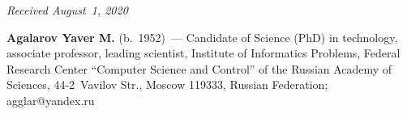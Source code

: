 \vspace*{-3pt}

  \hfill{\small\textit{Received August~1, 2020}}



\vspace*{-8pt}



\Contrl

\noindent
  \textbf{Agalarov Yaver M.} (b.\ 1952)~--- Candidate of Science (PhD) in
technology, associate professor, leading scientist, Institute of Informatics Problems,
Federal Research Center ``Computer Science and Control'' of the Russian Academy
of Sciences, 44-2~Vavilov Str., Moscow 119333, Russian Federation;
\mbox{agglar@yandex.ru}
\label{end\stat}

\renewcommand{\bibname}{\protect\rm Литература}